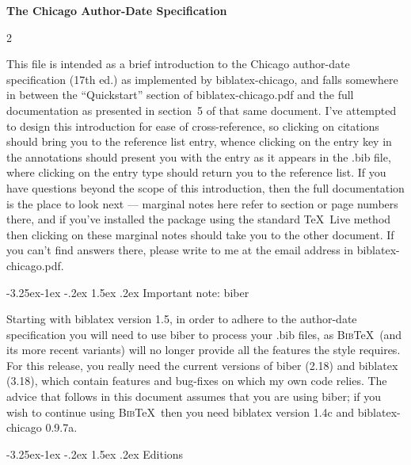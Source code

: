 \documentclass[a4paper,12pt]{article}
\makeatletter
\renewcommand{\section}{\@startsection{section}{1}{\z@}%
                                     {-3.25ex\@plus -1ex \@minus -.2ex}%
                                     {1.5ex \@plus .2ex}%
                                     {\normalfont\large\bfseries}}
\makeatother
\begin{document}
{\Large\bfseries The Chicago Author-Date Specification}
\vspace*{1.5ex}
\begin{multicols}{2}
  \renewcommand{\contentsname}{\textcolor{darkgray}{Contents}}
  \footnotesize
  \tableofcontents
\end{multicols}
This file is intended as a brief introduction to the Chicago
author-date specification (17th ed.) \autocite{chicago:manual} as
implemented by \textsf{biblatex-chicago}, and falls somewhere in
between the \enquote{Quickstart} section of
\textsf{biblatex-chicago.pdf} and the full documentation as presented
in section~5  of that same document.  I've
attempted to design this introduction for ease of cross-reference, so
clicking on citations should bring you to the reference list entry,
whence clicking on the entry key in the annotations should present you
with the entry as it appears in the .bib file, where clicking on the
entry type should return you to the reference list.  If you have
questions beyond the scope of this introduction, then the full
documentation is the place to look next --- marginal notes here refer
to section or page numbers there, and if you've installed the package
using the standard \TeX\ Live method then clicking on these marginal
notes should take you to the other document.  If you can't find
answers there, please write to me at the email address in
\textsf{biblatex-chicago.pdf}.

\section{Important note: \textsf{biber}}
\label{bibernote}

Starting with \textsf{biblatex} version 1.5, in order to adhere to the
author-date specification you will need to use \textsf{biber} to
process your .bib files, as \textsc{Bib}\TeX\ (and its more recent
variants) will no longer provide all the features the style requires.
For this release, you really need the current versions of
\textsf{biber} (2.18) and \textsf{biblatex} (3.18), which contain
features and bug-fixes on which my own code relies.  The advice that
follows in this document assumes that you are using \textsf{biber}; if
you wish to continue using \textsc{Bib}\TeX\ then you need
\textsf{biblatex} version 1.4c and \textsf{biblatex-chicago} 0.9.7a.

\section{Editions}
\label{editions}
\end{document}
